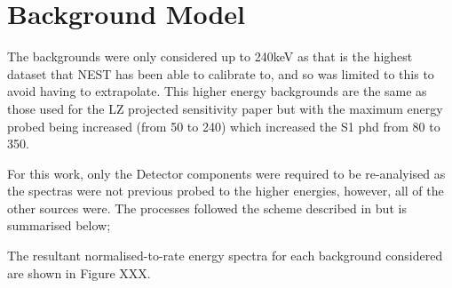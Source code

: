 \section{Background Model}
\par
The backgrounds were only considered up to 240keV as that is the highest dataset that NEST has been able to calibrate to, and so was limited to this to avoid having to extrapolate.
This higher energy backgrounds are the same as those used for the LZ projected sensitivity paper \cite{LZ_projected_sensitivity_paper_ref} but with the maximum energy probed being increased (from 50 to 240) which increased the S1 phd from 80 to 350.

\par
For this work, only the Detector components were required to be re-analyised as the spectras were not previous probed to the higher energies, however, all of the other sources were.
The processes followed the scheme described in \cite{LZ_projected_sensitivity_paper_ref} but is summarised below;



\par
The resultant normalised-to-rate energy spectra for each background considered are shown in Figure XXX.

